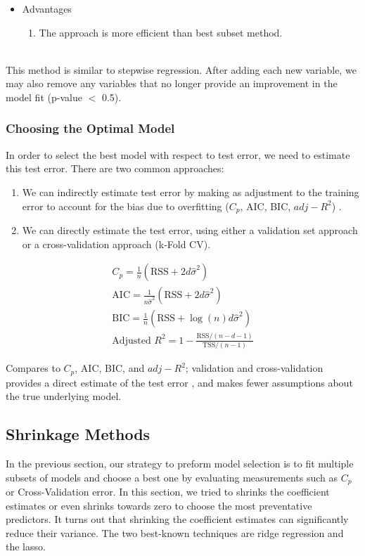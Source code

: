 \documentclass[12pt,a4paper]{article}%
\theoremstyle{definition}
\theoremstyle{plain}
\numberwithin{equation}{section}
\newcounter{subsubsubsection}[subsubsection]
\begin{document}
\begin{itemize}
\item Advantages
\begin{enumerate}
	\item The approach is more efficient than best subset method.
\end{enumerate}
\end{itemize}

~\\
This method is similar to stepwise regression. After adding each new variable, we may also remove any variables that no longer provide an improvement in the model fit (p-value $<$ 0.5).

\subsubsection{\textbf{Choosing the Optimal Model}}
In order to select the best model with respect to test error, we need to estimate this test error. There are two common approaches:
\begin{enumerate}
\item We can indirectly estimate test error by making as adjustment to the training error to account for the bias due to overfitting ($C_{p}$, AIC, BIC, $adj-R^{2}$) .
\item We can directly estimate the test error, using either a validation set approach or a cross-validation approach (k-Fold CV).
\end{enumerate}

\begin{gather*}
C_{p} = \frac{1}{n}(\text{RSS}+2d\hat{\sigma}^{2}) \\
\text{AIC} = \frac{1}{n\hat{\sigma}^{2}}(\text{RSS}+2d\hat{\sigma}^{2})\\
\text{BIC} = \frac{1}{n}(\text{RSS}+\log (n)d\hat{\sigma}^{2})\\
\text{Adjusted } R^{2} = 1-\frac{\text{RSS}/(n-d-1)}{\text{TSS}/(n-1)} 
\end{gather*}

Compares to $C_{p}$, AIC, BIC, and $adj-R^{2}$; validation and cross-validation provides a direct estimate of the test error , and makes fewer assumptions about the true underlying model. 

\subsection{\textbf{Shrinkage Methods}}
In the previous section, our strategy to preform model selection is to fit multiple subsets of models and choose a best one by evaluating measurements such as $C_{p}$ or Cross-Validation error. 
In this section, we tried to shrinks the coefficient estimates or even shrinks towards zero to choose the most preventative predictors. It turns out that shrinking the coefficient estimates can significantly reduce their variance. The two best-known techniques are ridge regression and the lasso.
\end{document}
